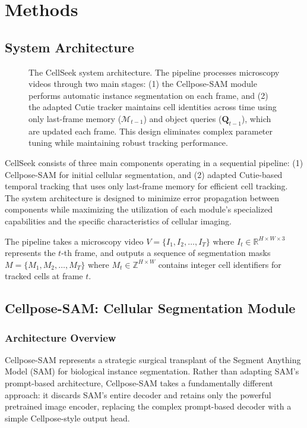\documentclass[../cellseek_paper.tex]{subfiles}
\begin{document}
\section{Methods}

\subsection{System Architecture}

\begin{figure}[h!]
  \centering
  
  \caption{The CellSeek system architecture. The pipeline processes microscopy videos through two main stages: (1) the Cellpose-SAM module performs automatic instance segmentation on each frame, and (2) the adapted Cutie tracker maintains cell identities across time using only last-frame memory ($\mathcal{M}_{t-1}$) and object queries ($\mathbf{Q}_{t-1}$), which are updated each frame. This design eliminates complex parameter tuning while maintaining robust tracking performance.}
  \label{fig:architecture}
\end{figure}

CellSeek consists of three main components operating in a sequential pipeline: (1) Cellpose-SAM for initial cellular segmentation, and (2) adapted Cutie-based temporal tracking that uses only last-frame memory for efficient cell tracking. The system architecture is designed to minimize error propagation between components while maximizing the utilization of each module's specialized capabilities and the specific characteristics of cellular imaging.

The pipeline takes a microscopy video $V = \{I_1, I_2, \ldots, I_T\}$ where $I_t \in \mathbb{R}^{H \times W \times 3}$ represents the $t$-th frame, and outputs a sequence of segmentation masks $M = \{M_1, M_2, \ldots, M_T\}$ where $M_t \in \mathbb{Z}^{H \times W}$ contains integer cell identifiers for tracked cells at frame $t$.

\subsection{Cellpose-SAM: Cellular Segmentation Module}

\subsubsection{Architecture Overview}

Cellpose-SAM represents a strategic surgical transplant of the Segment Anything Model (SAM) for biological instance segmentation. Rather than adapting SAM's prompt-based architecture, Cellpose-SAM takes a fundamentally different approach: it discards SAM's entire decoder and retains only the powerful pretrained image encoder, replacing the complex prompt-based decoder with a simple Cellpose-style output head.
\end{document}
